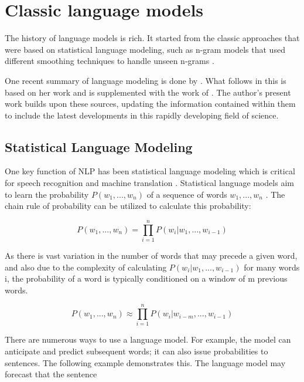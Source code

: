\section{Classic language models} 

The history of language models is rich. It started from the classic approaches that were based on statistical language modeling, such as n-gram models that used different smoothing techniques to handle unseen n-grams \parencite{kneser1995improved}.

One recent summary of language modeling is done by \textcite{popkes}. What follows in this is based on her work and is supplemented with the work of \textcite{lankinen}. The author's present work builds upon these sources, updating the information contained within them to include the latest developments in this rapidly developing field of science.

\subsection{Statistical Language Modeling}

One key function of NLP has been statistical language modeling which is critical for speech recognition and machine translation \parencite{rosenfeld2000two}. Statistical language models aim to learn the probability $P(w_1,...,w_{n})$ of a sequence of words $w_1,...,w_{n}$ \parencite{mikolov2010recurrent,goodman2001bit,jozefowicz2016exploring}. The chain rule of probability can be utilized to calculate this probability:

\begin{equation}
P(w_1,...,w_n) = \prod_{i=1}^{n} P(w_i|w_1,...,w_{i-1})
\end{equation}

As there is vast variation in the number of words that may precede a given word, and also due to the complexity of calculating $P(w_i|w_1,...,w_{i-1})$ for many words i, the probability of a word is typically conditioned on a window of m previous words.

\begin{equation}
P(w_1,...,w_n) \approx \prod_{i=1}^{n} P(w_i|w_{i-m},...,w_{i-1})
\end{equation}

There are numerous ways to use a language model. For example, the model can anticipate and predict subsequent words; it can also issue probabilities to sentences. The following example demonstrates this. The language model may forecast that the sentence

